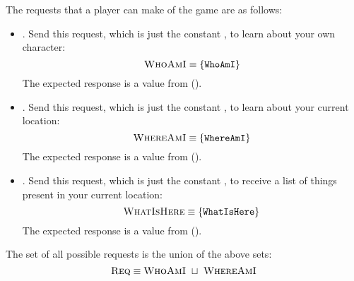The requests that a player can make of the game are as follows:
\begin{itemize}
\item \whoamireqset. Send this request, which is just the constant
  \whoamitg, to learn about your own character:
  \[ \textsc{WhoAmI} \equiv \{ \texttt{WhoAmI} \} \]
The expected response is a value from 
().
\item \whereamireqset. Send this request, which is just the constant
  \whereamitg, to learn about your current location:
  \[ \textsc{WhereAmI} \equiv \{ \texttt{WhereAmI} \} \]
The expected response is a value from 
().
\item \whatisherereqset. Send this request, which is just the constant
  \whatisheretg, to receive a list of things present in your current
  location:
  \[ \textsc{WhatIsHere} \equiv \{ \texttt{WhatIsHere} \} \]
The expected response is a value from 
().
\end{itemize}
The set of all possible requests is the union of the above sets:
\begin{equation}
  \textsc{Req} \equiv \textsc{WhoAmI} ~\sqcup~ \textsc{WhereAmI}
\end{equation}
